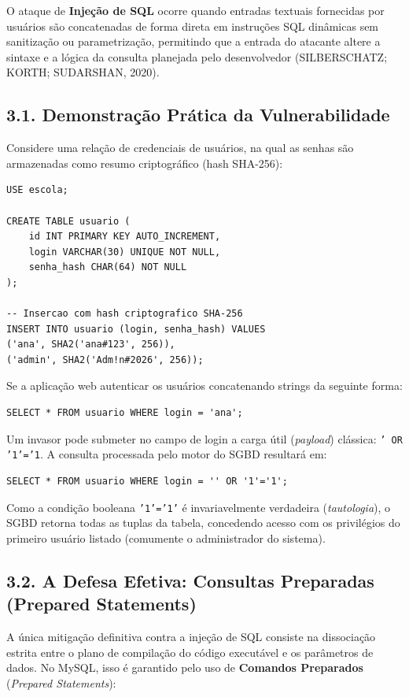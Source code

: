 O ataque de \textbf{Injeção de SQL} ocorre quando entradas textuais fornecidas por usuários são concatenadas de forma direta em instruções SQL dinâmicas sem sanitização ou parametrização, permitindo que a entrada do atacante altere a sintaxe e a lógica da consulta planejada pelo desenvolvedor (SILBERSCHATZ; KORTH; SUDARSHAN, 2020).

\subsection*{3.1. Demonstração Prática da Vulnerabilidade}

Considere uma relação de credenciais de usuários, na qual as senhas são armazenadas como resumo criptográfico (hash SHA-256):

\begin{lstlisting}
USE escola;

CREATE TABLE usuario (
    id INT PRIMARY KEY AUTO_INCREMENT,
    login VARCHAR(30) UNIQUE NOT NULL,
    senha_hash CHAR(64) NOT NULL
);

-- Insercao com hash criptografico SHA-256
INSERT INTO usuario (login, senha_hash) VALUES
('ana', SHA2('ana#123', 256)),
('admin', SHA2('Adm!n#2026', 256));
\end{lstlisting}

Se a aplicação web autenticar os usuários concatenando strings da seguinte forma:
\begin{lstlisting}
SELECT * FROM usuario WHERE login = 'ana';
\end{lstlisting}

Um invasor pode submeter no campo de login a carga útil (\textit{payload}) clássica: \texttt{' OR '1'='1}. A consulta processada pelo motor do SGBD resultará em:

\begin{lstlisting}
SELECT * FROM usuario WHERE login = '' OR '1'='1';
\end{lstlisting}
Como a condição booleana \texttt{'1'='1'} é invariavelmente verdadeira (\textit{tautologia}), o SGBD retorna todas as tuplas da tabela, concedendo acesso com os privilégios do primeiro usuário listado (comumente o administrador do sistema).

\subsection*{3.2. A Defesa Efetiva: Consultas Preparadas (Prepared Statements)}

A única mitigação definitiva contra a injeção de SQL consiste na dissociação estrita entre o plano de compilação do código executável e os parâmetros de dados. No MySQL, isso é garantido pelo uso de \textbf{Comandos Preparados} (\textit{Prepared Statements}):

